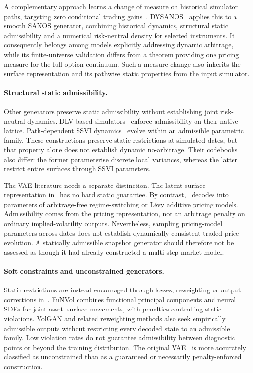 A complementary approach learns a change of measure on historical simulator paths, targeting
zero conditional trading gains~\cite{removedrift}. DYSANOS~\cite{DYSANOS2026} applies this to a smooth SANOS generator,
combining historical dynamics, structural static admissibility and a numerical risk-neutral density
for selected instruments. It consequently belongs among models explicitly addressing dynamic
arbitrage, while its finite-universe validation differs from a theorem providing one pricing measure
for the full option continuum. Such a measure change also inherits the surface representation
and its pathwise static properties from the input simulator.

\paragraph{Structural static admissibility.} Other generators preserve static admissibility without
establishing joint risk-neutral dynamics. DLV-based simulators~\cite{wiese2019simulate,wiese2021multiassetspotoptionmarket} enforce admissibility on
their native lattice. Path-dependent SSVI dynamics~\cite{AndresBoumezouedJourdain2023} evolve within an admissible parametric
family. These constructions preserve static restrictions at simulated dates, but that property alone
does not establish dynamic no-arbitrage. Their codebooks also differ: the former parameterise
discrete local variances, whereas the latter restrict entire surfaces through SSVI parameters.

The VAE literature needs a separate distinction. The latent surface representation in~\cite{BergeronEtAl2021} has no
hard static guarantee. By contrast,~\cite{vae_ning2023arbitrage} decodes into parameters of arbitrage-free regime-switching
or L\'evy additive pricing models. Admissibility comes from the pricing representation, not an
arbitrage penalty on ordinary implied-volatility outputs. Nevertheless, sampling pricing-model
parameters across dates does not establish dynamically consistent traded-price evolution. A
statically admissible snapshot generator should therefore not be assessed as though it had already
constructed a multi-step market model.

\paragraph{Soft constraints and unconstrained generators.} Static restrictions are instead encouraged
through losses, reweighting or output corrections in~\cite{ZhangLiZhang2021,ContVuletic2023,ChoudharyJaimungalBergeron2024,VuleticCont2024}. FuNVol combines functional principal
components and neural SDEs for joint asset--surface movements, with penalties controlling static
violations. VolGAN and related reweighting methods also seek empirically admissible outputs
without restricting every decoded state to an admissible family. Low violation rates do not
guarantee admissibility between diagnostic points or beyond the training distribution. The original
VAE~\cite{BergeronEtAl2021} is more accurately classified as unconstrained than as a guaranteed or necessarily
penalty-enforced construction.

